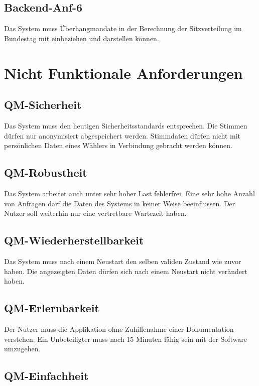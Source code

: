 \documentclass[a4paper]{scrreprt}
\begin{document}
\subsection{Backend-Anf-6}

Das System muss Überhangmandate in der Berechnung der Sitzverteilung im Bundestag mit einbeziehen und darstellen können. \\

\section{Nicht Funktionale Anforderungen}

\subsection{QM-Sicherheit}

Das System muss den heutigen Sicherheitsstandards entsprechen. Die Stimmen dürfen nur anonymisiert abgespeichert werden. Stimmdaten dürfen nicht mit persönlichen Daten eines Wählers in Verbindung gebracht werden können.

\subsection{QM-Robustheit}

Das System arbeitet auch unter sehr hoher Last fehlerfrei. Eine sehr hohe Anzahl von Anfragen darf die Daten des Systems in keiner Weise beeinflussen. Der Nutzer soll weiterhin nur eine vertretbare Wartezeit haben.

\subsection{QM-Wiederherstellbarkeit}

Das System muss nach einem Neustart den selben validen Zustand wie zuvor haben. Die angezeigten Daten dürfen sich nach einem Neustart nicht verändert haben.

\subsection{QM-Erlernbarkeit}

Der Nutzer muss die Applikation ohne Zuhilfenahme einer Dokumentation verstehen. Ein Unbeteiligter muss nach 15 Minuten fähig sein mit der Software umzugehen.

\subsection{QM-Einfachheit}
\end{document}
